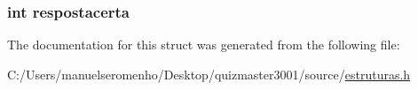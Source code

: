 \hypertarget{structperguntas_a3e23bda5c00103b6d418157ef2743768}{
\subsubsection[{respostacerta}]{\setlength{\rightskip}{0pt plus 5cm}int respostacerta}}\label{structperguntas_a3e23bda5c00103b6d418157ef2743768}


The documentation for this struct was generated from the following file\+:\begin{DoxyCompactItemize}
\item 
C\+:/\+Users/manuelseromenho/\+Desktop/quizmaster3001/source/\hyperlink{estruturas_8h}{estruturas.\+h}\end{DoxyCompactItemize}
